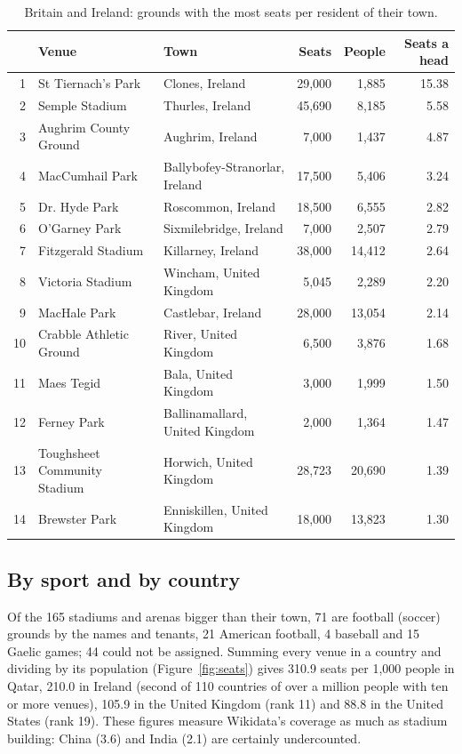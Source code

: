 \documentclass[11pt,a4paper]{article}
\begin{document}
\begin{table}[tbp]\centering\small\caption{Britain and Ireland: grounds with the most seats per resident of their town.}\label{tab:ukie}\begin{tabular}{rp{4.6cm}p{4.2cm}rrr}\toprule & Venue & Town & Seats & People & Seats a head\\\midrule
1 & St Tiernach's Park & Clones, Ireland & 29,000 & 1,885 & 15.38\\
2 & Semple Stadium & Thurles, Ireland & 45,690 & 8,185 & 5.58\\
3 & Aughrim County Ground & Aughrim, Ireland & 7,000 & 1,437 & 4.87\\
4 & MacCumhail Park & Ballybofey-Stranorlar, Ireland & 17,500 & 5,406 & 3.24\\
5 & Dr. Hyde Park & Roscommon, Ireland & 18,500 & 6,555 & 2.82\\
6 & O'Garney Park & Sixmilebridge, Ireland & 7,000 & 2,507 & 2.79\\
7 & Fitzgerald Stadium & Killarney, Ireland & 38,000 & 14,412 & 2.64\\
8 & Victoria Stadium & Wincham, United Kingdom & 5,045 & 2,289 & 2.20\\
9 & MacHale Park & Castlebar, Ireland & 28,000 & 13,054 & 2.14\\
10 & Crabble Athletic Ground & River, United Kingdom & 6,500 & 3,876 & 1.68\\
11 & Maes Tegid & Bala, United Kingdom & 3,000 & 1,999 & 1.50\\
12 & Ferney Park & Ballinamallard, United Kingdom & 2,000 & 1,364 & 1.47\\
13 & Toughsheet Community Stadium & Horwich, United Kingdom & 28,723 & 20,690 & 1.39\\
14 & Brewster Park & Enniskillen, United Kingdom & 18,000 & 13,823 & 1.30\\
\bottomrule\end{tabular}\end{table}

\subsection{By sport and by country}
Of the 165 stadiums and arenas bigger than their town, 71 are football (soccer) grounds by the names and tenants, 21 American football, 4 baseball and 15 Gaelic games; 44 could not be assigned. Summing every venue in a country and dividing by its population (Figure~\ref{fig:seats}) gives 310.9 seats per 1,000 people in Qatar, 210.0 in Ireland (second of 110 countries of over a million people with ten or more venues), 105.9 in the United Kingdom (rank 11) and 88.8 in the United States (rank 19). These figures measure Wikidata's coverage as much as stadium building: China (3.6) and India (2.1) are certainly undercounted.
\end{document}
